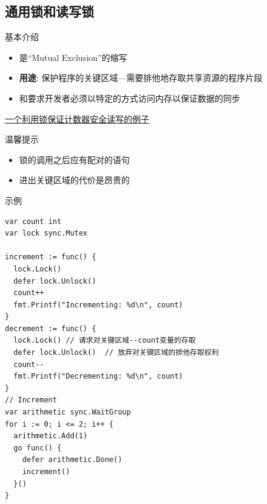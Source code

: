 \subsection{通用锁\Mutex 和读写锁\RWMutex }
\begin{frame}{基本介绍}
    \begin{itemize}
        \item \Mutex 是``Mutual Exclusion''的缩写
        \item \textbf{用途}: 保护程序的\alert{关键区域}---需要排他地存取共享资源的程序片段
        \item \Mutex 和\RWMutex 要求开发者必须以\alert{特定的方式}访问内存以保证数据的同步
    \end{itemize}

    \href{https://github.com/sammyne/concurrency-in-go/blob/master/chapter03/sync.pkg/mutex/basic.go}{一个利用锁保证计数器安全读写的例子}

    \begin{exampleblock}{温馨提示}
        \begin{itemize}
            \item 锁的调用之后应有配对的语句
            \item \alert{进出关键区域的代价是昂贵的}
        \end{itemize}    
    \end{exampleblock}
\end{frame}

\iffalse
\begin{frame}[fragile]{示例}
\begin{lstlisting}
var count int
var lock sync.Mutex

increment := func() {
  lock.Lock()
  defer lock.Unlock()
  count++
  fmt.Printf("Incrementing: %d\n", count)
}
decrement := func() {
  lock.Lock() // 请求对关键区域--count变量的存取
  defer lock.Unlock()  // 放弃对关键区域的排他存取权利
  count--
  fmt.Printf("Decrementing: %d\n", count)
}
// Increment
var arithmetic sync.WaitGroup
for i := 0; i <= 2; i++ {
  arithmetic.Add(1)
  go func() {
    defer arithmetic.Done()
    increment()
  }()
}
\end{lstlisting}
\end{frame}

